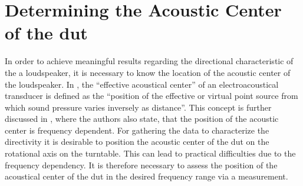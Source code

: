 \section{Determining the Acoustic Center of the \gls{dut}}\label{sec:ac_center}
In order to achieve meaningful results regarding the directional characteristic of the a loudspeaker, it is necessary to know the location of the  acoustic center of the loudspeaker.
In \citep{ansis1.1}, the ``effective acoustical center'' of an electroacoustical transducer is defined as the ``position of the effective or virtual point source from which sound pressure varies inversely as distance''. This concept is further discussed in \citep{jacobsenetal}, where the authors also state, that the position of the acoustic center is frequency dependent. For gathering the data to characterize the directivity it is desirable to position the acoustic center of the \gls{dut} on the rotational axis on the turntable. This can lead to practical difficulties due to the frequency dependency. It is therefore necessary to assess the position of the acoustical center of the \gls{dut} in the desired frequency range via a measurement.\\

